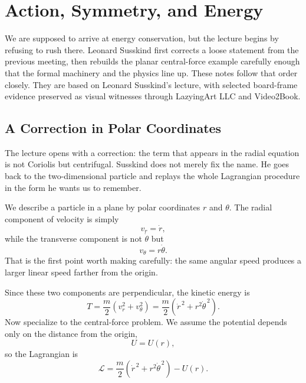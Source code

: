 \chapter{Action, Symmetry, and Energy}

We are supposed to arrive at energy conservation, but the lecture begins by refusing to rush there. Leonard Susskind first corrects a loose statement from the previous meeting, then rebuilds the planar central-force example carefully enough that the formal machinery and the physics line up. These notes follow that order closely. They are based on Leonard Susskind's lecture, with selected board-frame evidence preserved as visual witnesses through LazyingArt LLC and Video2Book.

\section{A Correction in Polar Coordinates}

The lecture opens with a correction: the term that appears in the radial equation is not Coriolis but centrifugal. Susskind does not merely fix the name. He goes back to the two-dimensional particle and replays the whole Lagrangian procedure in the form he wants us to remember.

We describe a particle in a plane by polar coordinates \(r\) and \(\theta\). The radial component of velocity is simply
\begin{equation}
v_r=\dot r,
\end{equation}
while the transverse component is not \(\dot\theta\) but
\begin{equation}
v_\theta=r\dot\theta.
\end{equation}
That is the first point worth making carefully: the same angular speed produces a larger linear speed farther from the origin.

Since these two components are perpendicular, the kinetic energy is
\begin{equation}
T=\frac{m}{2}\left(v_r^2+v_\theta^2\right)
=\frac{m}{2}\left(\dot r^{\,2}+r^2\dot\theta^{\,2}\right).
\end{equation}
Now specialize to the central-force problem. We assume the potential depends only on the distance from the origin,
\begin{equation}
U=U(r),
\end{equation}
so the Lagrangian is
\begin{equation}
\mathcal{L}=\frac{m}{2}\left(\dot r^{\,2}+r^2\dot\theta^{\,2}\right)-U(r).
\end{equation}


